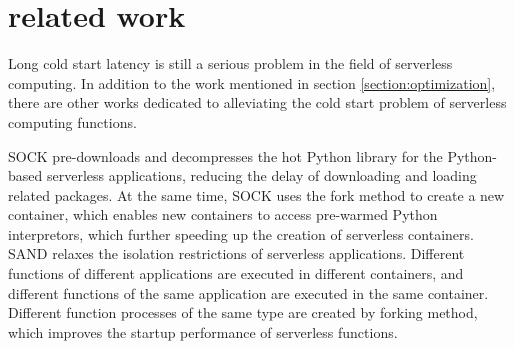 \section{related work}
Long cold start latency is still a
serious problem in the field of serverless computing.
In addition to the work mentioned in section \ref{section:optimization},
there are other works dedicated to alleviating the cold start problem of serverless computing functions.

SOCK\cite{sock} pre-downloads and decompresses the hot
Python library for the Python-based serverless applications,
reducing the delay of downloading and loading related packages.
At the same time,
SOCK uses the fork method to create a new container,
which enables new containers to access pre-warmed Python interpretors,
which further speeding up the creation of serverless containers.
SAND\cite{sand} relaxes the isolation restrictions of serverless applications.
Different functions of different applications are executed in different containers,
and different functions of the same application are executed in the same container.
Different function processes of the same type are created by forking method, 
which improves the startup performance of serverless functions.
